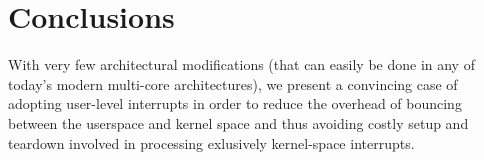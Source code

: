 \section{Conclusions}
With very few architectural modifications (that can easily be done in any of
today's modern multi-core architectures), we present a convincing case of
adopting user-level interrupts in order to reduce the overhead of bouncing
between the userspace and kernel space and thus avoiding costly setup and
teardown involved in processing exlusively kernel-space interrupts.
